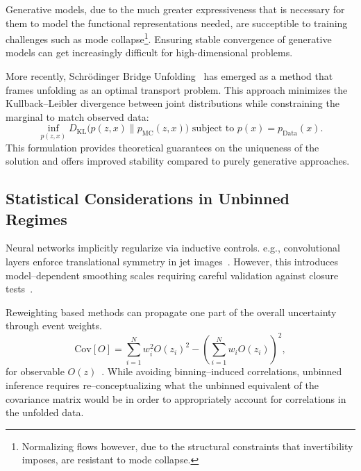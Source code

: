             Generative models, due to the much greater expressiveness that is necessary for them to model the functional representations needed, are succeptible to training challenges such as mode collapse\footnote{Normalizing flows however, due to the structural constraints that invertibility imposes, are resistant to mode collapse.}.
            Ensuring stable convergence of generative models can get increasingly difficult for high-dimensional problems.
            
            More recently, Schrödinger Bridge Unfolding~\cite{Butter2025GenerativeMapping} has emerged as a method that frames unfolding as an optimal transport problem.
            This approach minimizes the Kullback--Leibler divergence between joint distributions while constraining the marginal to match observed data:
            \begin{equation}
                \inf_{p(z,x)} D_{\text{KL}}\Big(p(z,x) \parallel p_{\text{MC}}(z,x)\Big) \text{ subject to } p(x) = p_{\text{Data}}(x).
            \end{equation}
            This formulation provides theoretical guarantees on the uniqueness of the solution and offers improved stability compared to purely generative approaches.
        \subsection{Statistical Considerations in Unbinned Regimes}  
            Neural networks implicitly regularize via inductive controls. 
            e.g., convolutional layers enforce translational symmetry in jet images~\cite{Kheddar2025ImageSurvey}.
            However, this introduces model--dependent smoothing scales requiring careful validation against closure tests~\cite{Cowan2011AsymptoticPhysics}.

            Reweighting based methods can propagate one part of the overall uncertainty through event weights.
            \begin{equation}
                \text{Cov}[O] = \sum_{i=1}^N w_i^2 O(z_i)^2 - \left(\sum_{i=1}^N w_i O(z_i)\right)^2,
            \end{equation}
            for observable \(O(z)\)~\cite{LHCHiggsCrossSectionWorkingGroup2012HandbookDistributions}.
            While avoiding binning--induced correlations, unbinned inference requires re--conceptualizing what the unbinned equivalent of the covariance matrix would be in order to appropriately account for correlations in the unfolded data.
